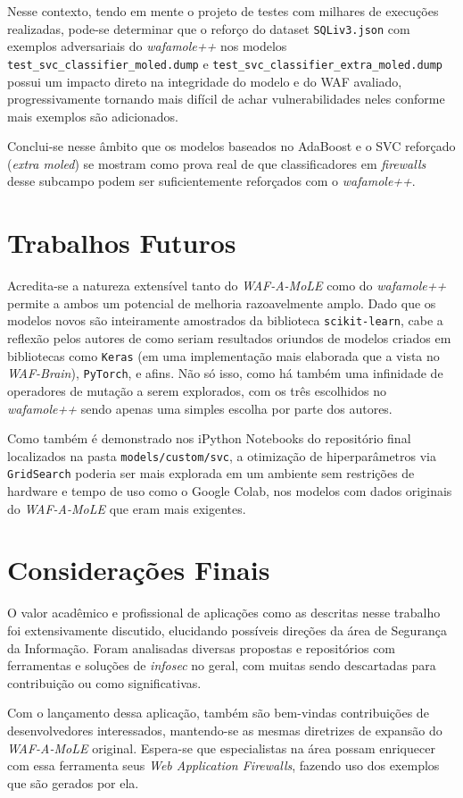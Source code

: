 Nesse contexto, tendo em mente o projeto de testes com milhares de execuções realizadas, pode-se determinar que o reforço do dataset \verb+SQLiv3.json+ com exemplos adversariais do \textit{wafamole++} nos modelos \verb+test_svc_classifier_moled.dump+ e \linebreak \verb+test_svc_classifier_extra_moled.dump+ possui um impacto direto na integridade do modelo e do WAF avaliado, progressivamente tornando mais difícil de achar vulnerabilidades neles conforme mais exemplos são adicionados.

Conclui-se nesse âmbito que os modelos baseados no AdaBoost e o SVC reforçado (\textit{extra moled}) se mostram como prova real de que classificadores em \textit{firewalls} desse subcampo podem ser suficientemente reforçados com o \textit{wafamole++}.


\section{Trabalhos Futuros}
Acredita-se a natureza extensível tanto do \textit{WAF-A-MoLE} como do \textit{wafamole++} permite a ambos um potencial de melhoria razoavelmente amplo. Dado que os modelos novos são inteiramente amostrados da biblioteca \verb+scikit-learn+, cabe a reflexão pelos autores de como seriam resultados oriundos de modelos criados em bibliotecas como \verb+Keras+ (em uma implementação mais elaborada que a vista no \textit{WAF-Brain}), \verb+PyTorch+, e afins. Não só isso, como há também uma infinidade de operadores de mutação a serem explorados, com os três escolhidos no \textit{wafamole++} sendo apenas uma simples escolha por parte dos autores.

Como também é demonstrado nos iPython Notebooks do repositório final localizados na pasta \verb+models/custom/svc+, a otimização de hiperparâmetros via \verb+GridSearch+ poderia ser mais explorada em um ambiente sem restrições de hardware e tempo de uso como o Google Colab, nos modelos com dados originais do \textit{WAF-A-MoLE} que eram mais exigentes. 

\section{Considerações Finais}
O valor acadêmico e profissional de aplicações como as descritas nesse trabalho foi extensivamente discutido, elucidando possíveis direções da área de Segurança da Informação. Foram analisadas diversas propostas e repositórios com ferramentas e soluções de \textit{infosec} no geral, com muitas sendo descartadas para contribuição ou como significativas. 

Com o lançamento dessa aplicação, também são bem-vindas contribuições de desenvolvedores interessados, mantendo-se as mesmas diretrizes de expansão do \textit{WAF-A-MoLE} original. Espera-se que especialistas na área possam enriquecer com essa ferramenta seus \textit{Web Application Firewalls}, fazendo uso dos exemplos que são gerados por ela.
